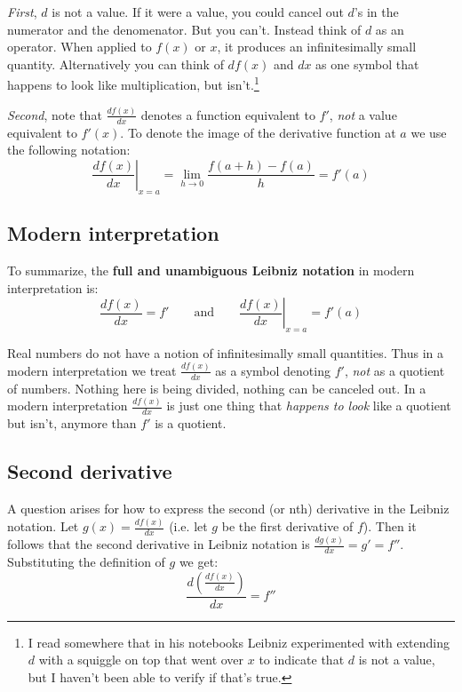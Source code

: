 \vs

\textit{First}, $d$ is not a value. If it were a value, you could
cancel out $d$'s in the numerator and the denomenator. But you can't.
Instead think of $d$ as an operator. When applied to $f(x)$ or $x$, it
produces an infinitesimally small quantity. Alternatively you can
think of $df(x)$ and $dx$ as one symbol that happens to look like
multiplication, but isn't.\footnote{I read somewhere that in his
  notebooks Leibniz experimented with extending $d$ with a squiggle on
  top that went over $x$ to indicate that $d$ is not a value, but I
  haven't been able to verify if that's true.}

\vs

\textit{Second}, note that $\frac{df(x)}{dx}$ denotes a function
equivalent to $f'$, \textit{not} a value equivalent to $f'(x)$. To
denote the image of the derivative function at $a$ we use the
following notation:
\[\left. \frac{d f(x)}{dx} \right|_{x=a}=\lim_{h\to0}\frac{f(a+h)-f(a)}{h}=f'(a)\]

\subsection{Modern interpretation}

To summarize, the \textbf{full and unambiguous Leibniz notation} in
modern interpretation is:
\[\frac{df(x)}{dx}=f' \qquad\text{and}\qquad \left. \frac{d f(x)}{dx} \right|_{x=a}=f'(a)\]

Real numbers do not have a notion of infinitesimally small quantities.
Thus in a modern interpretation we treat $\frac{df(x)}{dx}$ as a
symbol denoting $f'$, \textit{not} as a quotient of numbers. Nothing
here is being divided, nothing can be canceled out. In a modern
interpretation $\frac{df(x)}{dx}$ is just one thing that
\textit{happens to look} like a quotient but isn't, anymore than $f'$
is a quotient.

\subsection{Second derivative}

A question arises for how to express the second (or nth) derivative in
the Leibniz notation. Let $g(x)=\frac{df(x)}{dx}$ (i.e. let $g$ be the
first derivative of $f$). Then it follows that the second derivative
in Leibniz notation is $\frac{dg(x)}{dx}=g'=f''$. Substituting the
definition of $g$ we get:
\[\frac{d\left(\frac{df(x)}{dx}\right)}{dx}=f''\]

